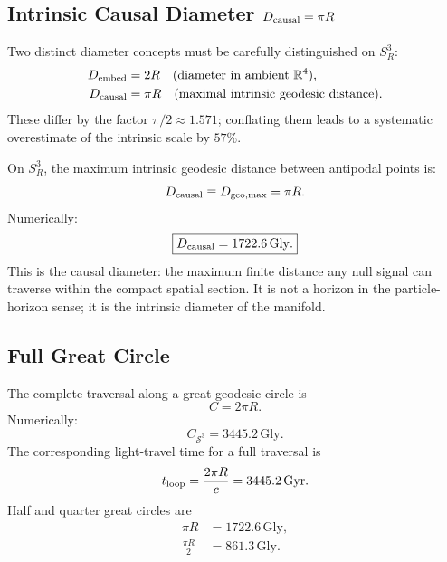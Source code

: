 \documentclass[aps,prd,onecolumn,superscriptaddress,longbibliography,nofootinbib,notitlepage]{revtex4-2}
\newcommand{\Gly}{\,\mathrm{Gly}}
\newcommand{\Gyr}{\,\mathrm{Gyr}}
\begin{document}
\subsection{Intrinsic Causal Diameter \texorpdfstring{$D_{\rm causal} = \pi R$}{Dcausal = pi R}}

Two distinct diameter concepts must be carefully distinguished on $S^3_R$:
\begin{align}
  D_{\rm embed}   &= 2R    \quad \text{(diameter in ambient }\mathbb{R}^4\text{),} \\
  D_{\rm causal}  &= \pi R \quad \text{(maximal intrinsic geodesic distance).}
\end{align}
These differ by the factor $\pi/2 \approx 1.571$; conflating them leads to a
systematic overestimate of the intrinsic scale by $57\%$.

On $S^3_R$, the maximum intrinsic geodesic distance between antipodal points is:
\begin{equation}
  D_{\rm causal} \equiv D_{\rm geo,max} = \pi R.
\end{equation}
Numerically:
\begin{equation}
  \boxed{D_{\rm causal} = 1722.6\Gly.}
\end{equation}
This is the causal diameter: the maximum finite distance any null signal can
traverse within the compact spatial section. It is not a horizon in the
particle-horizon sense; it is the intrinsic diameter of the manifold.

\subsection{Full Great Circle}

The complete traversal along a great geodesic circle is
\begin{equation}
  C = 2\pi R.
\end{equation}
Numerically:
\begin{equation}
  \boxed{C_{\mathcal{S}^3} = 3445.2\Gly.}
\end{equation}
The corresponding light-travel time for a full traversal is
\begin{equation}
  t_{\rm loop} = \frac{2\pi R}{c} = 3445.2\Gyr.
\end{equation}
Half and quarter great circles are
\begin{equation}
\begin{aligned}
  \pi R &= 1722.6\Gly, \\
  \frac{\pi R}{2} &= 861.3\Gly .
\end{aligned}
\end{equation}
\end{document}
